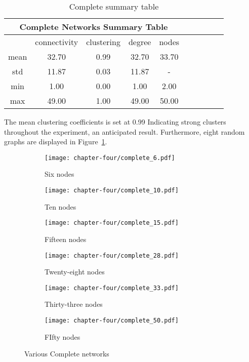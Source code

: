 \begin{table}[!hbtp]
	\centering
	\begin{adjustbox}{width=0.5\textwidth}
		\small
		\begin{tabular}{cccccccccc}
				\toprule
			\multicolumn{5}{|c|}{Complete Networks Summary Table}                     \\ \hline
			     & connectivity & clustering & degree & nodes                  \\ \hline
			mean & 32.70        & 0.99       & 32.70  & 33.70                  \\ \hline
			std  & 11.87        & 0.03       & 11.87  & \multicolumn{1}{c}{-} \\ \hline
			min  & 1.00         & 0.00       & 1.00   & 2.00                   \\ \hline
			max  & 49.00        & 1.00       & 49.00  & 50.00                  \\ \bottomrule
		\end{tabular}
	\end{adjustbox}
	\caption{Complete summary table}
	\label{table:complete-summary-table}
\end{table}

The mean clustering coefficients is set at 0.99 Indicating strong clusters
throughout the experiment, an anticipated result. Furthermore, eight random
graphs are displayed in Figure~\ref{complete_networks_illustration}.

\begin{figure}[!hbtp]
	\centering
	\begin{subfigure}[t]{0.30\textwidth}
		\centering
		\texttt{[image: chapter-four/complete\_6.pdf]}
		\caption{Six nodes}
	\end{subfigure}
	\hfill
	\begin{subfigure}[t]{0.30\textwidth}\centering
		\centering
		\texttt{[image: chapter-four/complete\_10.pdf]}
		\caption{Ten nodes}
	\end{subfigure}
	\hfill
	\begin{subfigure}[t]{0.30\textwidth}\centering
		\centering
		\texttt{[image: chapter-four/complete\_15.pdf]}
		\caption{Fifteen nodes}
	\end{subfigure}
	\hfill
	\begin{subfigure}[t]{0.30\textwidth}\centering
		\centering
		\texttt{[image: chapter-four/complete\_28.pdf]}
		\caption{Twenty-eight nodes}
	\end{subfigure}
	\hfill
	\begin{subfigure}[t]{0.30\textwidth}\centering
		\centering
		\texttt{[image: chapter-four/complete\_33.pdf]}
		\caption{Thirty-three nodes}
	\end{subfigure}
	\hfill
	\begin{subfigure}[t]{0.30\textwidth}\centering
		\centering
		\texttt{[image: chapter-four/complete\_50.pdf]}
		\caption{FIfty nodes}
	\end{subfigure}
	\caption{Various Complete networks}
	\label{complete_networks_illustration}
\end{figure}

